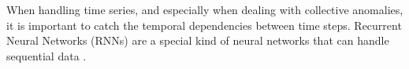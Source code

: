 When handling time series, and especially when dealing with collective anomalies, it is important to catch the temporal dependencies between time steps. Recurrent Neural Networks (RNNs) are a special kind of neural networks that can handle sequential data \cite{}.